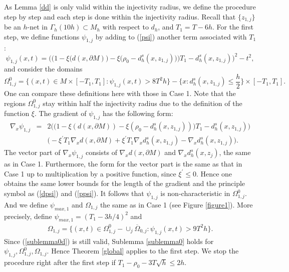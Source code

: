 \documentclass[11pt,letterpaper]{amsart}
\numberwithin{equation}{section}
\theoremstyle{definition}
\theoremstyle{plain}
\theoremstyle{definition}
\theoremstyle{plain}
\theoremstyle{definition}
\theoremstyle{plain}
\begin{document}
\smallskip
As Lemma \ref{dd} is only valid within the injectivity radius, we define the procedure step by step and each step is done within the injectivity radius. Recall that $\{z_{1,j}\}$ be an $h$-net in $\Gamma_h(10h)\subset M_h$ with respect to $d_h$, and $T_1=T-6h$. For the first step, we define functions $\psi_{1,j}$ by adding to (\ref{psi}) another term associated with $T_1$:
\begin{equation}\label{psi1}
\psi_{1,j}(x,t)=\bigg(\Big(1-\xi \big(d(x,\partial M)\big)-\xi \big(\rho_0-d_h^s(x,z_{1,j})\big)\Big)T_1-d_h^s(x,z_{1,j})\bigg)^2-t^2,
\end{equation}
and consider the domains
\begin{equation}\label{Omega01}
\Omega^0_{1,j} =\big\{(x,t)\in M\times [-T_1,T_1]: \psi_{1,j}(x,t) > 8T^2 h \big\}-\{x: d_h^s(x,z_{1,j})\leqslant \frac{h}{2}\}\times [-T_1,T_1].
\end{equation}
One can compare these definitions here with those in Case 1. Note that the regions $\Omega_{1,j}^0$ stay within half the injectivity radius due to the definition of the function $\xi$. The gradient of $\psi_{1,j}$ has the following form:
\begin{eqnarray*}
\nabla_x\psi_{1,j}&=&2\Big(\big(1-\xi(d(x,\partial M))-\xi(\rho_0-d_h^s(x,z_{1,j}))\big)T_1-d_h^s(x,z_{1,j})\Big) \\
&&\big(-\xi^{\prime}T_1\nabla_x d(x,\partial M) +\xi^{\prime}T_1\nabla_x d_h^s(x,z_{1,j})-\nabla_x d_h^s(x,z_{1,j})\big).
\end{eqnarray*}
The vector part of $\nabla_x \psi_{1,j}$ consists of $\nabla_x d(x,\partial M)$ and $\nabla_x d_h^s(x,z_j)$, the same as in Case 1. Furthermore, the form for the vector part is the same as that in Case 1 up to multiplication by a positive function, since $\xi^{\prime}\leqslant 0$. Hence one obtains the same lower bounds for the length of the gradient and the principle symbol as (\ref{dpsi}) and (\ref{ppsi}). It follows that $\psi_{1,j}$ is non-characteristic in $\Omega^{0}_{1,j}$. And we define $\psi_{max,1}$ and $\Omega_{1,j}$ the same as in Case 1 (see Figure \ref{figure1}). More precisely, define $\psi_{max,1}=(T_1-3h/4)^2$ and
\begin{eqnarray}\label{1other}
\Omega_{1,j}=\big\{(x,t)\in \Omega^0_{1,j}-\cup_j \overline{\Omega}_{0,j}: \psi_{1,j}(x,t) > 9T^2 h \big\}.
\end{eqnarray}
Since (\ref{sublemma0d}) is still valid, Sublemma \ref{sublemma0} holds for $\psi_{1,j},\Omega_{1,j}^0,\Omega_{1,j}$. Hence Theorem \ref{global} applies to the first step. We stop the procedure right after the first step if $T_1-\rho_0-3T\sqrt{h}\leqslant 2h$.
\end{document}
